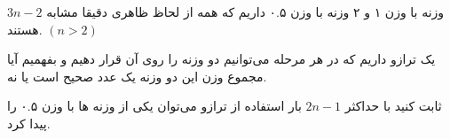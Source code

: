 \begin{PROBLEM}
	\p
	$3n - 2$
	وزنه با وزن ۱ و ۲ وزنه با وزن ۰.۵ داریم که همه از لحاظ ظاهری دقیقا مشابه هستند.
	$(n > 2)$

	یک ترازو داریم که در هر مرحله می‌توانیم دو وزنه را روی آن قرار دهیم و بفهمیم آیا مجموع وزن این دو وزنه یک عدد صحیح است یا نه.

	ثابت کنید با حداکثر 
	$2n-1$
	بار استفاده از ترازو می‌توان یکی از وزنه ها با وزن ۰.۵ را پیدا کرد.
	\SOLUTION{
		\p

	}
\end{PROBLEM}
